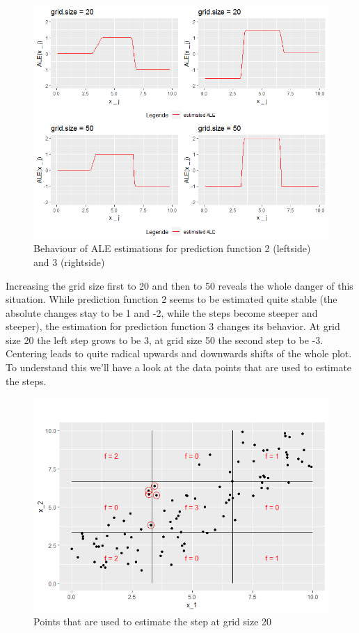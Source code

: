 \documentclass[]{krantz}
\begin{document}
\begin{figure}
\includegraphics[width=1\linewidth]{images/ALE_2_pwc_example5_gs20_50_} \caption{Behaviour of ALE estimations for prediction
function 2 (leftside) and 3 (rightside)}\label{fig:pwcexample5gs2050}
\end{figure}




Increasing the grid size first to 20 and then to 50 reveals the whole
danger of this situation. While prediction function 2 seems to be
estimated quite stable (the absolute changes stay to be 1 and -2, while
the steps become steeper and steeper), the estimation for prediction
function 3 changes its behavior. At grid size 20 the left step grows to
be 3, at grid size 50 the second step to be -3. Centering leads to quite
radical upwards and downwards shifts of the whole plot. To understand
this we'll have a look at the data points that are used to estimate the
steps.

\begin{figure}
\includegraphics[width=1\linewidth]{images/ALE_2_pwc_example5_critical_points2_} \caption{Points that are used to estimate
the step at grid size 20}\label{fig:ALE2pwcexample5criticalpoints2}
\end{figure}
\end{document}
